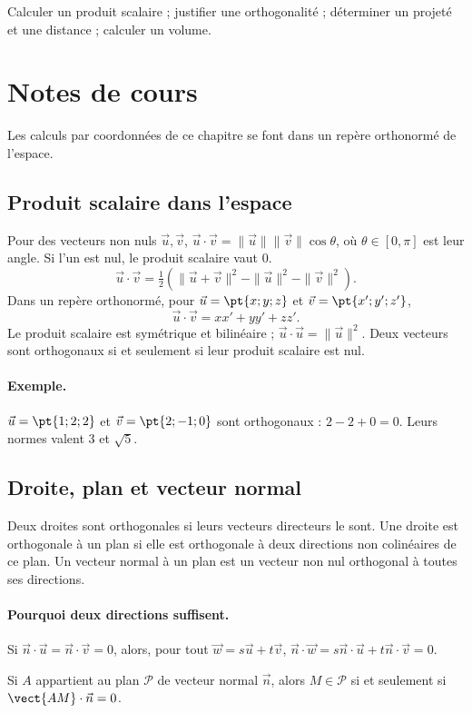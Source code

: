 \label{ch:11}


\begin{keypoint}[Objectifs]Calculer un produit scalaire ; justifier une orthogonalité ; déterminer un projeté et une distance ; calculer un volume.\end{keypoint}

\section{Notes de cours}
Les calculs par coordonnées de ce chapitre se font dans un repère orthonormé de l'espace.
\subsection{Produit scalaire dans l'espace}
Pour des vecteurs non nuls $\vec u,\vec v$, $\vec u\cdot\vec v=\|\vec u\|\|\vec v\|\cos\theta$, où $\theta\in[0,\pi]$ est leur angle. Si l'un est nul, le produit scalaire vaut $0$.
\[\vec u\cdot\vec v=\tfrac12(\|\vec u+\vec v\|^2-\|\vec u\|^2-\|\vec v\|^2).
\]
Dans un repère orthonormé, pour $\vec u=\pt{x;y;z}$ et $\vec v=\pt{x';y';z'}$,
\[\vec u\cdot\vec v=xx'+yy'+zz'.\]
Le produit scalaire est symétrique et bilinéaire ; $\vec u\cdot\vec u=\|\vec u\|^2$. Deux vecteurs sont orthogonaux si et seulement si leur produit scalaire est nul.
\paragraph{Exemple.} $\vec u=\pt{1;2;2}$ et $\vec v=\pt{2;-1;0}$ sont orthogonaux : $2-2+0=0$. Leurs normes valent $3$ et $\sqrt5$.
\subsection{Droite, plan et vecteur normal}
Deux droites sont orthogonales si leurs vecteurs directeurs le sont. Une droite est orthogonale à un plan si elle est orthogonale à deux directions non colinéaires de ce plan. Un vecteur normal à un plan est un vecteur non nul orthogonal à toutes ses directions.
\paragraph{Pourquoi deux directions suffisent.} Si $\vec n\cdot\vec u=\vec n\cdot\vec v=0$, alors, pour tout $\vec w=s\vec u+t\vec v$, $\vec n\cdot\vec w=s\vec n\cdot\vec u+t\vec n\cdot\vec v=0$.
\begin{keypoint}
Si $A$ appartient au plan $\mathcal P$ de vecteur normal $\vec n$, alors $M\in\mathcal P$ si et seulement si $\vect{AM}\cdot\vec n=0$.
\end{keypoint}
